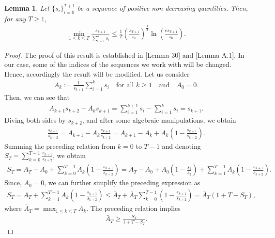 \documentclass{article}
\theoremstyle{plain}
\newtheorem{lemma}[theorem]{Lemma}
\theoremstyle{definition}
\theoremstyle{remark}
\begin{document}
\begin{lemma}\label{lem_sum_seq}
    Let $\{s_i\}_{i=0}^{T+1}$ be a sequence of positive non-decreasing quantities. Then, for any $T \geq 1$,
    \begin{align*}
        \min_{1 \leq k \leq T} \frac{s_{k+1}}{\sum_{i=1}^{k} s_i} \leq \frac{1}{T}
       \left(\frac{s_{T+1}}{s_0}\right)^{\frac{1}{T}} \ln \left( \frac{e s_{T+1}}{s_0} \right) .
    \end{align*}
\end{lemma}
%
%
\begin{proof}
The proof of this result is established in \cite{liu2023stochastic} [Lemma 30] and \cite{moshtaghifar2025dada} [Lemma A.1]. In our case, some of the indices of the sequences we work with will be changed. Hence, accordingly the result will be modified. Let us consider
\begin{align*}
    A_{k} := \frac{1}{s_{k+1}} \sum_{i=1}^{k} s_i \quad \text{for all $k \geq 1$} \quad \text{and} \quad A_0 = 0 .
\end{align*}
Then, we can see that
\begin{align*}
    A_{k+1} s_{k+2} - A_{k} s_{k+1} = \sum_{i=1}^{k+1} s_i - \sum_{i=1}^{k} s_i = s_{k+1} .
\end{align*}
Diving both sides by $s_{k+2}$, and after some algebraic manipulations, we obtain
\begin{align*}
    \frac{s_{k+1}}{s_{k+2}} = A_{k+1} - A_k \frac{s_{k+1}}{s_{k+2}} = A_{k+1} - A_k + A_k \left( 1 - \frac{s_{k+1}}{s_{k+2}} \right) .
\end{align*}
Summing the preceding relation from $k = 0$ to $T-1$ and denoting $S_T = \sum_{k=0}^{T-1} \frac{s_{k+1}}{s_{k+2}}$, we obtain
\begin{align*}
    S_T = A_{T} - A_0 + \sum_{k=0}^{T-1} A_k \left( 1 - \frac{s_{k+1}}{s_{k+2}} \right) = A_{T} - A_0 + A_0 \left( 1 - \frac{s_{1}}{s_{2}} \right) + \sum_{k=1}^{T-1} A_k \left( 1 - \frac{s_{k+1}}{s_{k+2}} \right). 
\end{align*}
Since, $A_0 = 0$, we can further simplify the preceding expression as
\begin{align*}
    S_T = A_{T} + \sum_{k=1}^{T-1} A_k \left( 1 - \frac{s_{k+1}}{s_{k+2}} \right) \leq \bar A_T + \bar A_T \sum_{k=0}^{T-1} \left( 1 - \frac{s_{k+1}}{s_{k+2}} \right) = \bar A_T (1 + T - S_T) ,
\end{align*}
where $\bar A_T = \max_{1 \leq k \leq T} A_k$. The preceding relation implies
\begin{align}
    \bar A_T \geq \frac{S_T}{1 + T - S_T} . \label{max_A_lb}

\end{align}
\end{proof}
\end{document}
